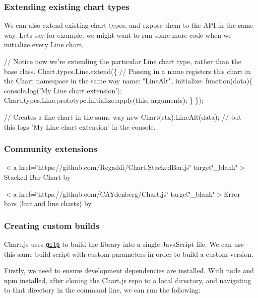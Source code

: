 \subsubsection*{Extending existing chart types}

We can also extend existing chart types, and expose them to the A\+PI in the same way. Let\textquotesingle{}s say for example, we might want to run some more code when we initialize every Line chart.


\begin{DoxyCode}
// Notice now we're extending the particular Line chart type, rather than the base class.
Chart.types.Line.extend(\{
    // Passing in a name registers this chart in the Chart namespace in the same way
    name: "LineAlt",
    initialize: function(data)\{
        console.log('My Line chart extension');
        Chart.types.Line.prototype.initialize.apply(this, arguments);
    \}
\});

// Creates a line chart in the same way
new Chart(ctx).LineAlt(data);
// but this logs 'My Line chart extension' in the console.
\end{DoxyCode}


\subsubsection*{Community extensions}


\begin{DoxyItemize}
\item $<$a href=\char`\"{}https\+://github.\+com/\+Regaddi/\+Chart.\+Stacked\+Bar.\+js\char`\"{} target\char`\"{}\+\_\+blank\char`\"{}$>$Stacked Bar Chart by \href{https://twitter.com/Regaddi}{\tt }
\item $<$a href=\char`\"{}https\+://github.\+com/\+C\+A\+Ydenberg/\+Chart.\+js\char`\"{} target\char`\"{}\+\_\+blank\char`\"{}$>$Error bars (bar and line charts) by \href{https://twitter.com/CAYdenberg}{\tt }
\end{DoxyItemize}

\subsubsection*{Creating custom builds}

Chart.\+js uses \href{http://gulpjs.com/}{\tt gulp} to build the library into a single Java\+Script file. We can use this same build script with custom parameters in order to build a custom version.

Firstly, we need to ensure development dependencies are installed. With node and npm installed, after cloning the Chart.\+js repo to a local directory, and navigating to that directory in the command line, we can run the following\+:



